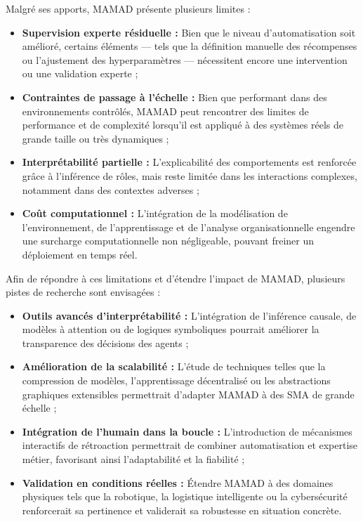 \documentclass[pdflatex,sn-mathphys-num]{sn-jnl}%
\theoremstyle{thmstyleone}%
\theoremstyle{thmstyletwo}%
\theoremstyle{thmstylethree}%
\begin{document}
Malgré ses apports, MAMAD présente plusieurs limites :

\begin{itemize}
    \item \textbf{Supervision experte résiduelle :} Bien que le niveau d'automatisation soit amélioré, certains éléments — tels que la définition manuelle des récompenses ou l'ajustement des hyperparamètres — nécessitent encore une intervention ou une validation experte ;
    \item \textbf{Contraintes de passage à l'échelle :} Bien que performant dans des environnements contrôlés, MAMAD peut rencontrer des limites de performance et de complexité lorsqu'il est appliqué à des systèmes réels de grande taille ou très dynamiques ;
    \item \textbf{Interprétabilité partielle :} L'explicabilité des comportements est renforcée grâce à l'inférence de rôles, mais reste limitée dans les interactions complexes, notamment dans des contextes adverses ;
    \item \textbf{Coût computationnel :} L'intégration de la modélisation de l'environnement, de l'apprentissage et de l'analyse organisationnelle engendre une surcharge computationnelle non négligeable, pouvant freiner un déploiement en temps réel.
\end{itemize}

\noindent Afin de répondre à ces limitations et d'étendre l'impact de MAMAD, plusieurs pistes de recherche sont envisagées :

\begin{itemize}
    \item \textbf{Outils avancés d'interprétabilité :} L'intégration de l'inférence causale, de modèles à attention ou de logiques symboliques pourrait améliorer la transparence des décisions des agents ;
    \item \textbf{Amélioration de la scalabilité :} L'étude de techniques telles que la compression de modèles, l'apprentissage décentralisé ou les abstractions graphiques extensibles permettrait d'adapter MAMAD à des SMA de grande échelle ;
    \item \textbf{Intégration de l'humain dans la boucle :} L'introduction de mécanismes interactifs de rétroaction permettrait de combiner automatisation et expertise métier, favorisant ainsi l'adaptabilité et la fiabilité ;
    \item \textbf{Validation en conditions réelles :} Étendre MAMAD à des domaines physiques tels que la robotique, la logistique intelligente ou la cybersécurité renforcerait sa pertinence et validerait sa robustesse en situation concrète.
\end{itemize}
\end{document}
